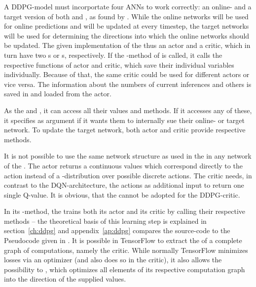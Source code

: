 A DDPG-model must incorportate four ANNs to work correctly: an online- and a target version of both  and , as found by \cite{lillicrap_continuous_2015}.  While the online networks will be used for online predictions and will be updated at every timestep, the target networks will be used for determining the directions into which the online networks should be updated. The given implementation of the  thus  an actor and a critic, which in turn have two s or s, respectively. If the -method of  is called, it calls the respective functions of actor and critic, which save their individual variables individually. Because of that, the same critic could be used for different actors or vice versa. The information about the numbers of current inferences and others is saved in and loaded from the actor.

As the    and , it can access all their values and methods. If it accesses any of these, it specifies as argument if it wants them to internally sue their online- or target network. To update the target network, both actor and critic provide respective methods.

It is not possible to use the same network structure as used in the  in any network of the . The actor returns a continuous values which correspond directly to the action instead of a -distribution over possible discrete actions. The critic needs, in contrast to the DQN-architecture, the actions as additional input to return one single Q-value. It is obvious, that the  cannot be adopted for the DDPG-critic.

In its -method, the  trains both its actor and its critic by calling their respective methods -- the theoretical basis of this learning step is explained in section~\ref{ch:ddpg} and appendix~\ref{ap:ddpg} compares the source-code to the Pseudocode given in \cite{lillicrap_continuous_2015}. It is possible in TensorFlow to extract the  of a complete graph of computations, namely the critic. While normally TensorFlow minimizes losses via an optimizer (and also does so in the critic), it also allows the possibility to , which optimizes all elements of its respective computation graph into the direction of the supplied values. 

